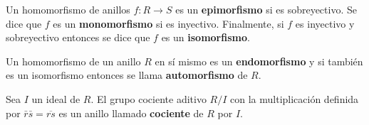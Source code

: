 \begin{definicion}
Un homomorfismo de anillos $f \colon R \to S$ es un \textbf{epimorfismo} si es sobreyectivo. Se dice que $f$ es un \textbf{monomorfismo} si es inyectivo. Finalmente, si $f$ es inyectivo y sobreyectivo entonces se dice que $f$ es un \textbf{isomorfismo}.
\end{definicion}
Un homomorfismo de un anillo $R$ en sí mismo es un \textbf{endomorfismo} y si también es un isomorfismo entonces se llama \textbf{automorfismo} de $R$.
\begin{definicion}
Sea $I$ un ideal de $R$. El grupo cociente aditivo $R/I$ con la multiplicación definida por $\bar{r}\bar{s} = \overline{rs}$ es un anillo llamado \textbf{cociente} de $R$ por $I$. 
\end{definicion}

